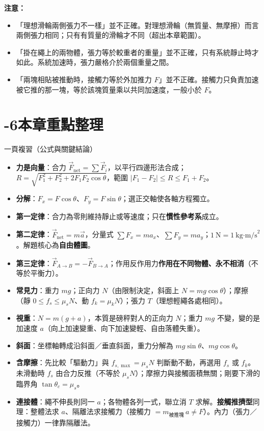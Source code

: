 \documentclass[11pt]{article}
\begin{document}
\textbf{注意：}
\begin{itemize}\setlength{\itemsep}{1pt}
\item 「理想滑輪兩側張力不一樣」並不正確。對理想滑輪（無質量、無摩擦）而言兩側張力相同；只有有質量的滑輪才不同（超出本章範圍）。
\item 「掛在繩上的兩物體，張力等於較重者的重量」並不正確，只有系統靜止時才如此。系統加速時，張力嚴格介於兩個重量之間。
\item 「兩塊相貼被推動時，接觸力等於外加推力 $F$」並不正確。接觸力只負責加速被它推的那一塊，等於該塊質量乘以共同加速度，一般小於 $F$。
\end{itemize}

\section*{-6\quad 本章重點整理}

\begin{補充框}{一頁複習（公式與關鍵結論）}
\begin{itemize}\setlength{\itemsep}{2pt}
\item \textbf{力是向量}：合力 $\vec F_{\text{net}}=\sum\vec F_i$，以平行四邊形法合成；$R=\sqrt{F_1^2+F_2^2+2F_1F_2\cos\theta}$，範圍 $|F_1-F_2|\le R\le F_1+F_2$。
\item \textbf{分解}：$F_x=F\cos\theta$、$F_y=F\sin\theta$；選正交軸使各軸方程獨立。
\item \textbf{第一定律}：合力為零則維持靜止或等速度；只在\textbf{慣性參考系}成立。
\item \textbf{第二定律}：$\vec F_{\text{net}}=m\vec a$，分量式 $\sum F_x=ma_x$、$\sum F_y=ma_y$；$1\ \text{N}=1\ \text{kg·m/s}^2$。解題核心為\textbf{自由體圖}。
\item \textbf{第三定律}：$\vec F_{A\to B}=-\vec F_{B\to A}$；作用反作用力\textbf{作用在不同物體、永不相消}（不等於平衡力）。
\item \textbf{常見力}：重力 $mg$；正向力 $N$（由限制決定，斜面上 $N=mg\cos\theta$）；摩擦（靜 $0\le f_s\le\mu_s N$、動 $f_k=\mu_k N$）；張力 $T$（理想輕繩各處相同）。
\item \textbf{視重}：$N=m(g+a)$，本質是磅秤對人的正向力 $N$；重力 $mg$ 不變，變的是加速度 $a$（向上加速變重、向下加速變輕、自由落體失重）。
\item \textbf{斜面}：坐標軸轉成沿斜面／垂直斜面，重力分解為 $mg\sin\theta$、$mg\cos\theta$。
\item \textbf{含摩擦}：先比較「驅動力」與 $f_{s,\max}=\mu_s N$ 判斷動不動，再選用 $f_s$ 或 $f_k$。未滑動時 $f_s$ 由合力反推（不等於 $\mu_s N$）；摩擦力與接觸面積無關；剛要下滑的臨界角 $\tan\theta_c=\mu_s$。
\item \textbf{連接體}：繩不伸長則同一 $a$；各物體各列一式，聯立消 $T$ 求解。\textbf{接觸推擠型}同理：整體法求 $a$、隔離法求接觸力（接觸力 $=m_{\text{被推塊}}\,a\neq F$）。內力（張力／接觸力）一律靠隔離法。
\end{itemize}
\end{補充框}
\end{document}
